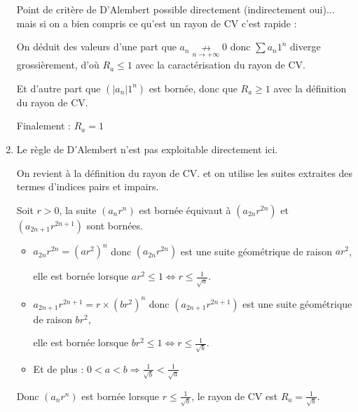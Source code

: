 \documentclass{book}
\begin{document}
\begin{Exercice}
\begin{Correction}
\begin{enumerate}
Point de critère de D'Alembert possible directement (indirectement oui)... mais si on a bien compris ce qu'est un rayon de CV c'est rapide :

On déduit des valeurs d'une part que $a_n \underset{n \to + \infty}{\nrightarrow} 0$ donc $\sum\limits a_n 1^{n} $ diverge grossièrement, d'où $R_a \leqslant 1$ avec la caractérisation du rayon de CV.

Et d'autre part que  $(|a_n| 1^{n}) $ est bornée, donc que $R_a \geqslant 1$ avec la définition du rayon de CV.

Finalement : $R_a = 1$


	\item %
Le règle de D'Alembert n'est pas exploitable directement ici.

On revient à la définition du rayon de CV. et on utilise les suites extraites des termes d'indices pairs et impairs.

Soit $r > 0$, la suite $(a_n r^n)$ est bornée équivaut à $(a_{2n} r^{2n})$ et $(a_{2n+1} r^{2n+1})$ sont bornées.

\begin{itemize}
	\item $a_{2n} r^{2n} = (a r^2)^n$ donc $(a_{2n} r^{2n})$ est une suite géométrique de raison $a r^2$,
	
	elle est bornée lorsque $a r^2 \leqslant 1 \Longleftrightarrow r \leqslant \frac{1}{\sqrt{a}}$.

	\item $a_{2n+1} r^{2n+1} = r \times (b r^2)^n$ donc $(a_{2n+1} r^{2n+1})$ est une suite géométrique de raison $b r^2$,
	
	elle est bornée lorsque $b r^2 \leqslant 1 \Longleftrightarrow r \leqslant \frac{1}{\sqrt{b}}$.
	
	\item Et de plus  :  $0<a<b \Rightarrow  \frac{1}{\sqrt{b}} <  \frac{1}{\sqrt{a}}$
\end{itemize}

Donc $(a_n r^n)$ est bornée lorsque $r \leqslant \frac{1}{\sqrt{b}}$, le rayon de CV est $R_a = \frac{1}{\sqrt{b}}$.
  \end{enumerate}
\end{Correction}
\end{Exercice}
\end{document}
